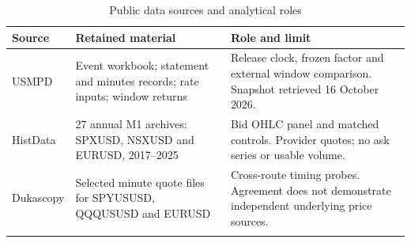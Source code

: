 \begin{table}[htbp]
\centering
{\fontsize{10}{12}\selectfont\renewcommand{\arraystretch}{1.22}\setlength{\tabcolsep}{4pt}
\begin{tabularx}{\linewidth}{@{}L{23mm}L{58mm}X@{}}
\toprule{}
\textbf{Source} & \textbf{Retained material} & \textbf{Role and limit} \\ \midrule
USMPD & Event workbook; statement and minutes records; rate inputs; window returns & Release clock, frozen factor and external window comparison. Snapshot retrieved 16 October 2026. \\ \hline
HistData & 27 annual M1 archives: SPXUSD, NSXUSD and EURUSD, 2017--2025 & Bid OHLC panel and matched controls. Provider quotes; no ask series or usable volume. \\ \hline
Dukascopy & Selected minute quote files for SPYUSUSD, QQQUSUSD and EURUSD & Cross-route timing probes. Agreement does not demonstrate independent underlying price sources. \\ \hline
{}\bottomrule\end{tabularx}}
\caption[Public data sources and analytical roles]{Public data sources and analytical roles}\label{tab:sources}
\end{table}
